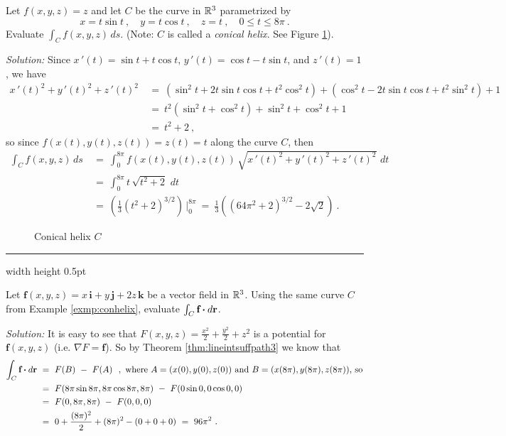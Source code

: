 \begin{exmp}\label{exmp:conhelix}
 Let $f(x,y,z) = z$ and let $C$ be the curve in $\mathbb{R}^{3}$ parametrized by
 \begin{displaymath}
  x=t\sin t ~,\quad y=t\cos t ~,\quad z=t ~,\quad 0\le t \le 8\pi ~.
 \end{displaymath}
 Evaluate $\int_C f(x,y,z)\,ds$. (Note:
 $C$ is called a \emph{conical helix}. See Figure \ref{fig:conhelix}).\vspace{1.5mm}
 \par\noindent \emph{Solution:} Since $x\,'(t)=\sin t + t\cos t$, $y\,'(t)=\cos t - t\sin t$, and $z\,'(t)=1$, we have
 \begin{align*}
  x\,'(t)^2 + y\,'(t)^2 + z\,'(t)^2 ~&=~ (\sin^2 t + 2t\sin t \cos t + t^2 \cos^2 t) + (\cos^2 t - 2t\sin t \cos t +
   t^2 \sin^2 t) + 1\\
   &=~ t^2 (\sin^2 t + \cos^2 t) + \sin^2 t + \cos^2 t + 1\\
   &=~ t^2 + 2 ~,
 \end{align*}
 so since $f(x(t),y(t),z(t)) = z(t) = t$ along the curve $C$, then
 \begin{align*}
  \int_C f(x,y,z)\,ds ~&=~ \int_0^{8\pi} f(x(t),y(t),z(t)) \,\sqrt{x\,'(t)^2 + y\,'(t)^2 + z\,'(t)^2}\,\,dt\\
   &=~ \int_0^{8\pi} t\,\sqrt{t^2 + 2}\,\,dt\\
   &=~ \left( \frac{1}{3} (t^2 + 2)^{3/2} \right) \,\Bigg|_0^{8\pi}
   ~=~ \frac{1}{3} \left( (64\pi^2 + 2)^{3/2} - 2\sqrt{2} \right) ~.
 \end{align*}\vspace{-24mm}
 \begin{figure}[h]
  \begin{center}
   
  \end{center}\vspace{-14mm}
  \caption[]{\quad Conical helix $C$}
  \label{fig:conhelix}
 \end{figure}
\end{exmp}\vspace{-2mm}
\hrule width \textwidth height 0.5pt
\begin{exmp}
 Let $\textbf{f}(x,y,z) = x\,\textbf{i} + y\,\textbf{j} + 2z\,\textbf{k}$ be a vector field in $\mathbb{R}^{3}$.
 Using the same curve $C$ from Example \ref{exmp:conhelix}, evaluate $\int_{C} \textbf{f} \bm{\cdot} d\textbf{r}$.\vspace{1.5mm}
 \par\noindent \emph{Solution:} It is easy to see that $F(x,y,z)=\frac{x^2}{2}+\frac{y^2}{2}+z^2$ is a potential for
 $\textbf{f}(x,y,z)$ (i.e. $\nabla F = \textbf{f}$). So by Theorem \ref{thm:lineintsuffpath3} we know that
 \begin{align*}
  \int_{C} \textbf{f} \bm{\cdot} d\textbf{r} ~&=~ F(B) ~-~ F(A) ~~,~\text{where $A=(x(0),y(0),z(0))$ and $B=(x(8\pi),y(8\pi),z(8\pi))$, so}\\
   &=~ F(8\pi\sin 8\pi,8\pi\cos 8\pi,8\pi) ~-~ F(0\sin 0,0\cos 0,0)\\
   &=~ F(0,8\pi,8\pi) ~-~ F(0,0,0)\\
   &=~ 0+\frac{(8\pi)^2}{2} + (8\pi)^2 - (0+0+0)
   ~=~ 96\pi^2 ~.
 \end{align*}
\end{exmp}
